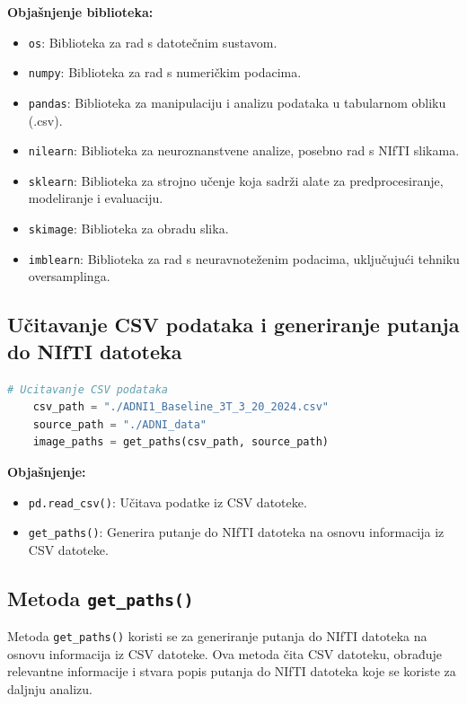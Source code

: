 \documentclass[zavrsnirad]{fer}
\begin{document}
\noindent \textbf{Objašnjenje biblioteka:}
\begin{itemize}
	\item \texttt{os}: Biblioteka za rad s datotečnim sustavom.
	\item \texttt{numpy}: Biblioteka za rad s numeričkim podacima.
	\item \texttt{pandas}: Biblioteka za manipulaciju i analizu podataka u tabularnom obliku (.csv).
	\item \texttt{nilearn}: Biblioteka za neuroznanstvene analize, posebno rad s NIfTI slikama.
	\item \texttt{sklearn}: Biblioteka za strojno učenje koja sadrži alate za predprocesiranje, modeliranje i evaluaciju.
	\item \texttt{skimage}: Biblioteka za obradu slika.
	\item \texttt{imblearn}: Biblioteka za rad s neuravnoteženim podacima, uključujući tehniku oversamplinga.
\end{itemize}

\subsection{Učitavanje CSV podataka i generiranje putanja do NIfTI datoteka}

\begin{lstlisting}[language=Python, caption={Učitavanje podataka i generiranje putanja}]
	# Ucitavanje CSV podataka
	csv_path = "./ADNI1_Baseline_3T_3_20_2024.csv"
	source_path = "./ADNI_data"
	image_paths = get_paths(csv_path, source_path)
\end{lstlisting}

\noindent \textbf{Objašnjenje:}
\begin{itemize}
	\item \texttt{pd.read\_csv()}: Učitava podatke iz CSV datoteke.
	\item \texttt{get\_paths()}: Generira putanje do NIfTI datoteka na osnovu informacija iz CSV datoteke.
\end{itemize}

\subsection{Metoda \texttt{get\_paths()}}

Metoda \texttt{get\_paths()} koristi se za generiranje putanja do NIfTI datoteka na osnovu informacija iz CSV datoteke. Ova metoda čita CSV datoteku, obrađuje relevantne informacije i stvara popis putanja do NIfTI datoteka koje se koriste za daljnju analizu.
\end{document}
